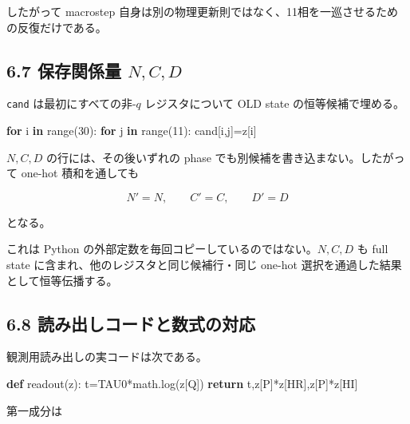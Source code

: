 \documentclass[
  a4paper,
]{ltjsarticle}
\newenvironment{Shaded}{}{}
\newcommand{\BuiltInTok}[1]{\textcolor[rgb]{0.00,0.50,0.00}{#1}}
\newcommand{\ControlFlowTok}[1]{\textcolor[rgb]{0.00,0.44,0.13}{\textbf{#1}}}
\newcommand{\DecValTok}[1]{\textcolor[rgb]{0.25,0.63,0.44}{#1}}
\newcommand{\KeywordTok}[1]{\textcolor[rgb]{0.00,0.44,0.13}{\textbf{#1}}}
\newcommand{\NormalTok}[1]{#1}
\newcommand{\OperatorTok}[1]{\textcolor[rgb]{0.40,0.40,0.40}{#1}}
\begin{document}
したがって macrostep
自身は別の物理更新則ではなく、11相を一巡させるための反復だけである。

\subsection{\texorpdfstring{6.7 保存関係量
\(N,C,D\)}{6.7 保存関係量 N,C,D}}\label{ux4fddux5b58ux95a2ux4fc2ux91cf-ncd}

\texttt{cand} は最初にすべての非-\(q\) レジスタについて OLD state
の恒等候補で埋める。

\begin{Shaded}
\begin{Highlighting}[]
\ControlFlowTok{for}\NormalTok{ i }\KeywordTok{in} \BuiltInTok{range}\NormalTok{(}\DecValTok{30}\NormalTok{):}
    \ControlFlowTok{for}\NormalTok{ j }\KeywordTok{in} \BuiltInTok{range}\NormalTok{(}\DecValTok{11}\NormalTok{):}
\NormalTok{        cand[i,j]}\OperatorTok{=}\NormalTok{z[i]}
\end{Highlighting}
\end{Shaded}

\(N,C,D\) の行には、その後いずれの phase
でも別候補を書き込まない。したがって one-hot 積和を通しても

\[
\boxed{
N'=N,
\qquad
C'=C,
\qquad
D'=D
}
\]

となる。

これは Python の外部定数を毎回コピーしているのではない。\(N,C,D\) も
full state に含まれ、他のレジスタと同じ候補行・同じ one-hot
選択を通過した結果として恒等伝播する。

\subsection{6.8
読み出しコードと数式の対応}\label{ux8aadux307fux51faux3057ux30b3ux30fcux30c9ux3068ux6570ux5f0fux306eux5bfeux5fdc}

観測用読み出しの実コードは次である。

\begin{Shaded}
\begin{Highlighting}[]
\KeywordTok{def}\NormalTok{ readout(z):}
\NormalTok{    t}\OperatorTok{=}\NormalTok{TAU0}\OperatorTok{*}\NormalTok{math.log(z[Q])}
    \ControlFlowTok{return}\NormalTok{ t,z[P]}\OperatorTok{*}\NormalTok{z[HR],z[P]}\OperatorTok{*}\NormalTok{z[HI]}
\end{Highlighting}
\end{Shaded}

第一成分は
\end{document}
